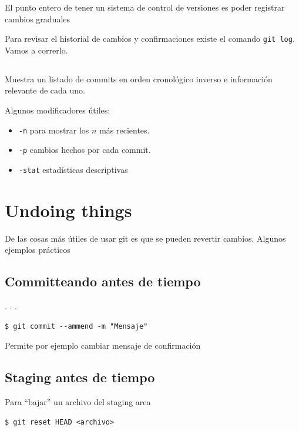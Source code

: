 El punto entero de tener un sistema de control de versiones es poder
registrar cambios graduales

Para revisar el historial de cambios y confirmaciones existe el comando
\passthrough{\lstinline!git log!}. Vamos a correrlo.

\subsection{}

Muestra un listado de commits en orden cronológico inverso e información
relevante de cada uno.

Algunos modificadores útiles:

\begin{itemize}
\tightlist
\item
  \passthrough{\lstinline!-n!} para mostrar los \(n\) más recientes.
\item
  \passthrough{\lstinline!-p!} cambios hechos por cada commit.
\item
  \passthrough{\lstinline!-stat!} estadísticas descriptivas
\end{itemize}

\section{Undoing things}

De las cosas más útiles de usar git es que se pueden revertir cambios.
Algunos ejemplos prácticos

\subsection{Committeando antes de tiempo}

. . .

\begin{lstlisting}
$ git commit --ammend -m "Mensaje"
\end{lstlisting}

Permite por ejemplo cambiar mensaje de confirmación

\subsection{Staging antes de tiempo}

Para ``bajar'' un archivo del staging area

\begin{lstlisting}
$ git reset HEAD <archivo>
\end{lstlisting}

